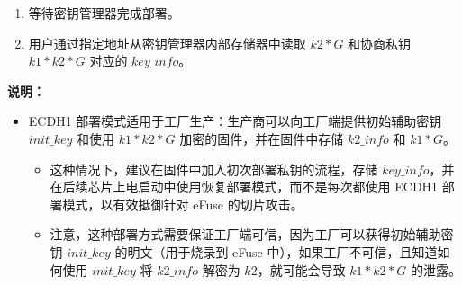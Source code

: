 \documentclass[main\_\_CN.tex]{subfiles}
\begin{document}
\begin{enumerate}
\begin{enumerate}
        \item 等待密钥管理器完成部署。
        \item 用户通过指定地址从密钥管理器内部存储器中读取 \hyperref[para:k2G]{\begin{math}k2*G\end{math}} 和协商私钥 \hyperref[para:k1k2G]{\begin{math}k1*k2*G\end{math}} 对应的 \hyperref[para:keyinfo]{\begin{math}key\_info\end{math}}。
    \end{enumerate}
\end{enumerate}

\textbf{说明：}\\

\begin{itemize}
    \item ECDH1 部署模式适用于工厂生产：生产商可以向工厂端提供初始辅助密钥 \hyperref[para:initkey]{\begin{math}init\_key\end{math}}
    和使用 \hyperref[para:k1k2G]{\begin{math}k1*k2*G\end{math}} 加密的固件，并在固件中存储 \hyperref[para:k2info]{\begin{math}k2\_info\end{math}} 和 \hyperref[para:k1G]{\begin{math}k1*G\end{math}}。
    \begin{itemize}
        \item 这种情况下，建议在固件中加入初次部署私钥的流程，存储 \hyperref[para:keyinfo]{\begin{math}key\_info\end{math}}，并在后续芯片上电启动中使用恢复部署模式，而不是每次都使用 ECDH1 部署模式，以有效抵御针对 eFuse 的切片攻击。
        \item 注意，这种部署方式需要保证工厂端可信，因为工厂可以获得初始辅助密钥 \hyperref[para:initkey]{\begin{math}init\_key\end{math}} 的明文（用于烧录到 eFuse 中），如果工厂不可信，且知道如何使用 \hyperref[para:initkey]{\begin{math}init\_key\end{math}} 将 \hyperref[para:k2info]{\begin{math}k2\_info\end{math}} 解密为 \hyperref[para:k2]{\begin{math}k2\end{math}}，就可能会导致 \hyperref[para:k1k2G]{\begin{math}k1*k2*G\end{math}} 的泄露。

\end{itemize}
\end{itemize}
\end{document}
